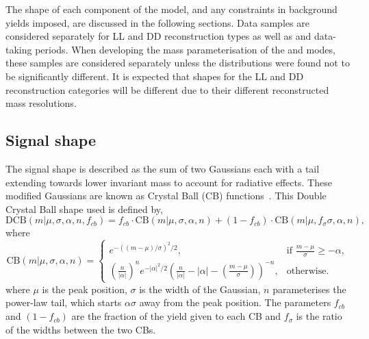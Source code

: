 The shape of each component of the model, and any constraints in background yields imposed, are discussed in the following sections. Data samples are considered separately for LL and DD \KS reconstruction types as well as \runone and \runtwo data-taking periods. When developing the mass parameterisation of the \kpi and \kpipipi modes, these samples are considered separately unless the distributions were found not to be significantly different. It is expected that shapes for the LL and DD \KS reconstruction categories will be different due to their different reconstructed \Bm mass resolutions.

\subsection{Signal shape}
\label{sec:massfit:signal}

The signal shape is described as the sum of two Gaussians each with a tail extending towards lower invariant mass to account for radiative effects. These modified Gaussians are known as Crystal Ball (CB) functions~\cite{Skwarnicki:1986xj}. This Double Crystal Ball shape used is defined by,
\begin{equation}
\mathrm{DCB}(m| \mu,\sigma,\alpha,n,f_{cb}) = f_{cb} \cdot \mathrm{CB}(m| \mu,\sigma,\alpha,n) + (1-f_{cb}) \cdot \mathrm{CB}(m|\mu,f_{\sigma}\sigma,\alpha,n),
\label{DCBshape}
\end{equation}
where
\begin{equation*}
  \mathrm{CB}(m| \mu,\sigma,\alpha,n)=
\begin{cases}
    e^{-((m-\mu)/ \sigma)^2/2},                                   & \text{if } \frac{m-\mu}{\sigma} \geq - \alpha, \\
   \left ( \frac{n}{|\alpha|} \right ) ^n e^{-|\alpha|^2/2} \left ( \frac{n}{|\alpha|} - |\alpha| - \left ( \frac{m-\mu}{\sigma} \right ) \right ) ^{-n} ,    & \text{otherwise.}
\end{cases}
\end{equation*}
where $\mu$ is the peak position, $\sigma$ is the width of the Gaussian, $n$ parameterises the power-law tail, which starts $\alpha\sigma$ away from the peak position. The parameters $f_{cb}$ and $(1-f_{cb})$ are the fraction of the yield given to each CB and $f_{\sigma}$ is the ratio of the widths between the two CBs.

